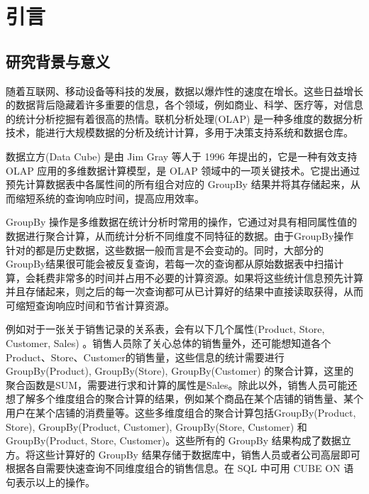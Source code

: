 \chapter{引言}

\section{研究背景与意义}
随着互联网、移动设备等科技的发展，数据以爆炸性的速度在增长。这些日益增长的数据背后隐藏着许多重要的信息，各个领域，例如商业、科学、医疗等，对信息的统计分析挖掘有着很高的热情。联机分析处理(OLAP) \cite{chaudhuri1997overview} 是一种多维度的数据分析技术，能进行大规模数据的分析及统计计算，多用于决策支持系统和数据仓库。\cite{wu2012avatara} \cite{sumbaly2013big}


数据立方(Data Cube) \cite{gray1997data} 是由 Jim Gray 等人于 1996 年提出的，它是一种有效支持 OLAP 应用的多维数据计算模型，是 OLAP 领域中的一项关键技术。它提出通过预先计算数据表中各属性间的所有组合对应的 GroupBy 结果并将其存储起来，从而缩短系统的查询响应时间，提高应用效率。

GroupBy 操作是多维数据在统计分析时常用的操作，它通过对具有相同属性值的数据进行聚合计算，从而统计分析不同维度不同特征的数据。由于GroupBy操作针对的都是历史数据，这些数据一般而言是不会变动的。同时，大部分的GroupBy结果很可能会被反复查询，若每一次的查询都从原始数据表中扫描计算，会耗费非常多的时间并占用不必要的计算资源。如果将这些统计信息预先计算并且存储起来，则之后的每一次查询都可从已计算好的结果中直接读取获得，从而可缩短查询响应时间和节省计算资源。

例如对于一张关于销售记录的关系表，会有以下几个属性(Product, Store, Customer, Sales)  \cite{beyer1999bottom}。销售人员除了关心总体的销售量外，还可能想知道各个Product、Store、Customer的销售量，这些信息的统计需要进行 GroupBy(Product), GroupBy(Store), GroupBy(Customer) 的聚合计算，这里的聚合函数是SUM，需要进行求和计算的属性是Sales。除此以外，销售人员可能还想了解多个维度组合的聚合计算的结果，例如某个商品在某个店铺的销售量、某个用户在某个店铺的消费量等。这些多维度组合的聚合计算包括GroupBy(Product, Store), GroupBy(Product, Customer), GroupBy(Store, Customer) 和 GroupBy(Product, Store, Customer)。这些所有的 GroupBy 结果构成了数据立方。将这些计算好的 GroupBy 结果存储于数据库中，销售人员或者公司高层即可根据各自需要快速查询不同维度组合的销售信息。在 SQL 中可用 CUBE ON 语句表示以上的操作。

